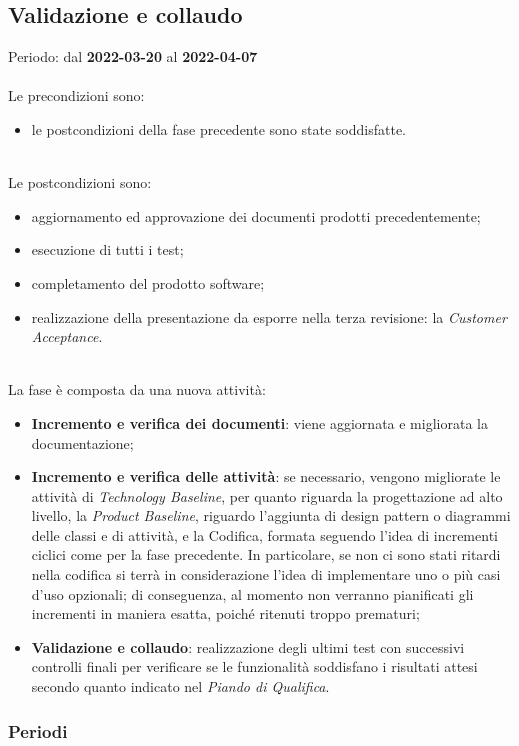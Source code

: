 \subsection{Validazione e collaudo}
Periodo: dal \textbf{2022-03-20} al \textbf{2022-04-07} \mbox{} \\ \mbox{} \\
Le precondizioni sono:
\begin{itemize}
	\item le postcondizioni della fase precedente sono state soddisfatte.
\end{itemize} \mbox{} \\
Le postcondizioni sono:
\begin{itemize}
	\item aggiornamento ed approvazione dei documenti prodotti precedentemente;
	\item esecuzione di tutti i test;
	\item completamento del prodotto software;
	\item realizzazione della presentazione da esporre nella terza revisione: la \textit{Customer Acceptance}. 
\end{itemize} \mbox{} \\
La fase è composta da una nuova attività:
\begin{itemize}
	\item \textbf{Incremento e verifica dei documenti}: viene aggiornata e migliorata la documentazione;
	\item \textbf{Incremento e verifica delle attività}: se necessario, vengono migliorate le attività di \textit{Technology Baseline}, per quanto riguarda la progettazione ad alto livello, la \textit{Product Baseline}, riguardo l’aggiunta di design pattern o diagrammi delle classi e di attività, e la Codifica, formata seguendo l’idea di incrementi ciclici come per la fase precedente. In particolare, se non ci sono stati ritardi nella codifica si terrà in considerazione l’idea di implementare uno o più casi d’uso opzionali; di conseguenza, al momento non verranno pianificati gli incrementi in maniera esatta, poiché ritenuti troppo prematuri;
	\item \textbf{Validazione e collaudo}: realizzazione degli ultimi test con successivi controlli finali per verificare se le funzionalità soddisfano i risultati attesi secondo quanto indicato nel \textit{Piando di Qualifica}.
\end{itemize}

\subsubsection{Periodi}

